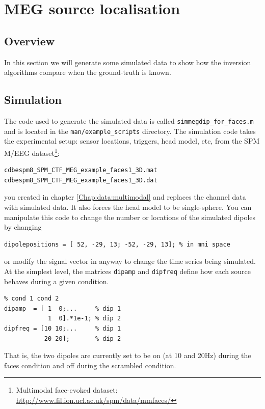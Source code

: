 \chapter{MEG source localisation\label{Chap:data:sloc}}

\section{Overview}
In this section we will generate some simulated data to show how the inversion algorithms compare when the ground-truth is known. 

\section{Simulation}
The code used to generate the simulated data is called \texttt{simmegdip\_for\_faces.m} and is located in the \texttt{man/example\_scripts} directory. The simulation code takes the experimental setup: sensor locations, triggers, head model, etc, from the SPM M/EEG dataset\footnote{Multimodal face-evoked dataset: \url{http://www.fil.ion.ucl.ac.uk/spm/data/mmfaces/}}:

\begin{verbatim}
cdbespm8_SPM_CTF_MEG_example_faces1_3D.mat
cdbespm8_SPM_CTF_MEG_example_faces1_3D.dat
\end{verbatim}

you created in chapter \ref{Chap:data:multimodal} and replaces the channel data with simulated data. It also forces the head model to be single-sphere.
You can manipulate this code to change the number or locations of the simulated dipoles by changing

\begin{verbatim}
dipolepositions = [ 52, -29, 13; -52, -29, 13]; % in mni space
\end{verbatim}
or modify the signal vector in anyway to change the time series being simulated. At the simplest level, the matrices \texttt{dipamp} and \texttt{dipfreq} define how each source behaves during a given condition. 

\begin{verbatim}
% cond 1 cond 2
dipamp  = [ 1  0;...     % dip 1
            1  0].*1e-1; % dip 2 
dipfreq = [10 10;...     % dip 1
           20 20];       % dip 2
\end{verbatim}

That is, the two dipoles are currently set to be on (at 10 and 20Hz) during the faces condition and off during the scrambled condition.

